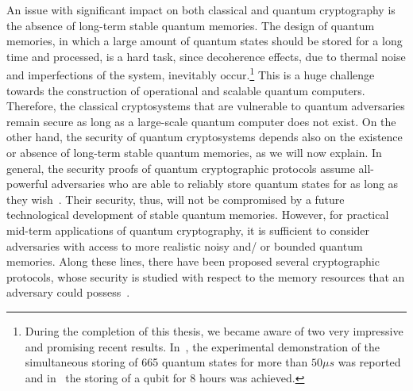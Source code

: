An issue with significant impact on both classical and quantum cryptography is the absence of long-term stable quantum memories. The design of quantum memories, in which a large amount of quantum states should be stored for a long time and processed, is a hard task, since decoherence effects, due to thermal noise and imperfections of the system, inevitably occur.\footnote{During the completion of this thesis, we became aware of two very impressive and promising recent results. In~\cite{warshaw:mem:17}, the experimental demonstration of the simultaneous storing of 665 quantum states for more than $50\mu s$ was reported and in~\cite{vienna:mem:18} the storing of a qubit for 8 hours was achieved.} This is a huge challenge towards the construction of operational and scalable quantum computers.
Therefore, the classical cryptosystems that are vulnerable to quantum adversaries remain secure as long as a large-scale quantum computer does not exist. On the other hand, the security of quantum cryptosystems depends also on the existence or absence of long-term stable quantum memories, as we will now explain. In general, the security proofs of quantum cryptographic protocols assume all-powerful adversaries who are able to reliably store quantum states for as long as they wish~\cite{ber:chr:col:ren:ren:10}. Their security, thus, will not be compromised by a future technological development of stable quantum memories. However, for practical mid-term applications of quantum cryptography, it is sufficient to consider adversaries with access to more realistic noisy and/ or bounded quantum memories. Along these lines, there have been proposed several cryptographic protocols, whose security is studied with respect to the memory resources that an adversary could possess~\cite{dam:feh:ren:sal:sch:07,weh:sch:ter:08,sch:ter:weh:09,ng:jos:che:kur:weh:12,koe:weh:wul:12,bou:feh:gon:sch:13,lou:alm:and:pin:mat:pau:14}.
   
